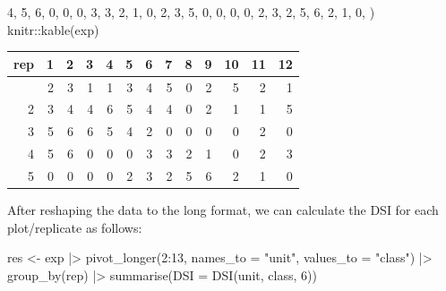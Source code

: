 \documentclass[
  letterpaper,
]{book}
\newenvironment{Shaded}{\begin{snugshade}}{\end{snugshade}}
\newcommand{\AttributeTok}[1]{\textcolor[rgb]{0.40,0.45,0.13}{#1}}
\newcommand{\DecValTok}[1]{\textcolor[rgb]{0.68,0.00,0.00}{#1}}
\newcommand{\FunctionTok}[1]{\textcolor[rgb]{0.28,0.35,0.67}{#1}}
\newcommand{\NormalTok}[1]{\textcolor[rgb]{0.00,0.23,0.31}{#1}}
\newcommand{\OtherTok}[1]{\textcolor[rgb]{0.00,0.23,0.31}{#1}}
\newcommand{\SpecialCharTok}[1]{\textcolor[rgb]{0.37,0.37,0.37}{#1}}
\newcommand{\StringTok}[1]{\textcolor[rgb]{0.13,0.47,0.30}{#1}}
\begin{document}
\begin{Shaded}
\begin{Highlighting}[]
  \DecValTok{4}\NormalTok{, }\DecValTok{5}\NormalTok{, }\DecValTok{6}\NormalTok{, }\DecValTok{0}\NormalTok{, }\DecValTok{0}\NormalTok{, }\DecValTok{0}\NormalTok{, }\DecValTok{3}\NormalTok{, }\DecValTok{3}\NormalTok{, }\DecValTok{2}\NormalTok{, }\DecValTok{1}\NormalTok{, }\DecValTok{0}\NormalTok{, }\DecValTok{2}\NormalTok{, }\DecValTok{3}\NormalTok{, }
  \DecValTok{5}\NormalTok{, }\DecValTok{0}\NormalTok{, }\DecValTok{0}\NormalTok{, }\DecValTok{0}\NormalTok{, }\DecValTok{0}\NormalTok{, }\DecValTok{2}\NormalTok{, }\DecValTok{3}\NormalTok{, }\DecValTok{2}\NormalTok{, }\DecValTok{5}\NormalTok{, }\DecValTok{6}\NormalTok{, }\DecValTok{2}\NormalTok{, }\DecValTok{1}\NormalTok{, }\DecValTok{0}\NormalTok{,}
\NormalTok{)}
\NormalTok{knitr}\SpecialCharTok{::}\FunctionTok{kable}\NormalTok{(exp)}
\end{Highlighting}
\end{Shaded}

\begin{longtable}[]{@{}rrrrrrrrrrrrr@{}}
\toprule\noalign{}
rep & 1 & 2 & 3 & 4 & 5 & 6 & 7 & 8 & 9 & 10 & 11 & 12 \\
\midrule\noalign{}
\endhead
\bottomrule\noalign{}
\endlastfoot
1 & 2 & 3 & 1 & 1 & 3 & 4 & 5 & 0 & 2 & 5 & 2 & 1 \\
2 & 3 & 4 & 4 & 6 & 5 & 4 & 4 & 0 & 2 & 1 & 1 & 5 \\
3 & 5 & 6 & 6 & 5 & 4 & 2 & 0 & 0 & 0 & 0 & 2 & 0 \\
4 & 5 & 6 & 0 & 0 & 0 & 3 & 3 & 2 & 1 & 0 & 2 & 3 \\
5 & 0 & 0 & 0 & 0 & 2 & 3 & 2 & 5 & 6 & 2 & 1 & 0 \\
\end{longtable}

After reshaping the data to the long format, we can calculate the DSI
for each plot/replicate as follows:

\begin{Shaded}
\begin{Highlighting}[]
\NormalTok{res }\OtherTok{\textless{}{-}}\NormalTok{ exp }\SpecialCharTok{|\textgreater{}} 
  \FunctionTok{pivot\_longer}\NormalTok{(}\DecValTok{2}\SpecialCharTok{:}\DecValTok{13}\NormalTok{, }\AttributeTok{names\_to =} \StringTok{"unit"}\NormalTok{, }\AttributeTok{values\_to =} \StringTok{"class"}\NormalTok{) }\SpecialCharTok{|\textgreater{}}
  \FunctionTok{group\_by}\NormalTok{(rep) }\SpecialCharTok{|\textgreater{}} 
  \FunctionTok{summarise}\NormalTok{(}\AttributeTok{DSI =} \FunctionTok{DSI}\NormalTok{(unit, class, }\DecValTok{6}\NormalTok{))}
\end{Highlighting}
\end{Shaded}
\end{document}
